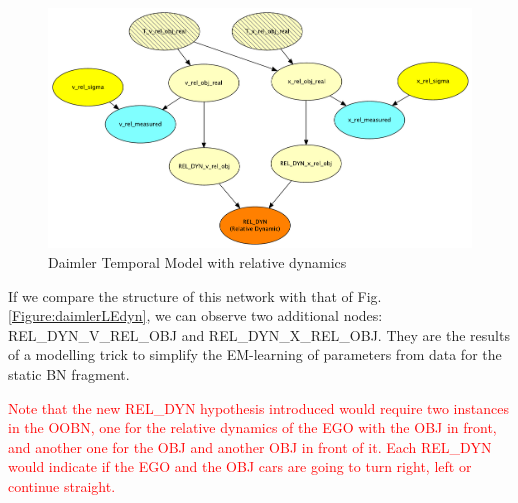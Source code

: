 {\begin{figure}
\begin{center}
\includegraphics[scale=0.4]{./figures/Daimlerreldyn.pdf}
\end{center}
\caption{\label{Figure:daimlerreldyn}Daimler Temporal Model with relative dynamics}
\end{figure}

If we compare the structure of this network with that of Fig. \ref{Figure:daimlerLEdyn}, we can observe two additional nodes:  REL\_DYN\_V\_REL\_OBJ and REL\_DYN\_X\_REL\_OBJ. They are the results of a modelling trick to simplify the EM-learning of parameters from data for the static BN fragment.

\textcolor{red}{Note that the new REL\_DYN hypothesis introduced would require two instances in the OOBN, one for the relative dynamics of the EGO with the OBJ in front, and another one for the OBJ and another OBJ in front of it. Each REL\_DYN would indicate if the EGO and the OBJ cars are going to turn right, left or continue straight.}
}

